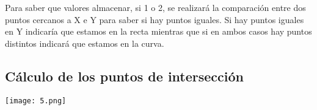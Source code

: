 \documentclass{article}
\begin{document}
Para saber que valores almacenar, si 1 o 2, se realizará la comparación entre dos puntos cercanos a X e Y para saber si hay puntos iguales. Si hay puntos iguales en Y indicaría que estamos en la recta mientras que si en ambos casos hay puntos distintos indicará que estamos en la curva. 

\subsection{Cálculo de los puntos de intersección}
\begin{center}
        \texttt{[image: 5.png]}
\end{center}
\end{document}
